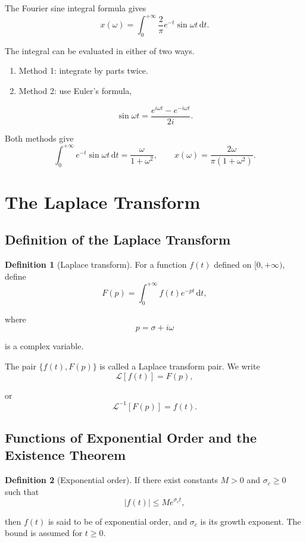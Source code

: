 \documentclass[11pt,a4paper]{article}
\theoremstyle{definition}
\newtheorem{definition}{Definition}
\theoremstyle{plain}
\begin{document}
The Fourier sine integral formula gives
\[
x(\omega)=\int_0^{+\infty}
\frac2\pi e^{-t}\sin\omega t\,\mathrm dt.
\]

The integral can be evaluated in either of two ways.

\begin{enumerate}
\item
  Method 1: integrate by parts twice.

\item
  Method 2: use Euler's formula,

\end{enumerate}
\[
\sin\omega t=\frac{e^{i\omega t}-e^{-i\omega t}}{2i}.
\]

Both methods give
\[
\int_0^{+\infty}e^{-t}\sin\omega t\,\mathrm dt
=\frac{\omega}{1+\omega^2},
\qquad
x(\omega)=\frac{2\omega}{\pi(1+\omega^2)}.
\]

\section{The Laplace Transform}

\subsection{Definition of the Laplace Transform}

\begin{definition}[Laplace transform]
For a function \(f(t)\) defined on \([0,+\infty)\), define
\[
F(p)=\int_0^{+\infty}f(t)e^{-pt}\,\mathrm dt,
\]

where
\[
p=\sigma+i\omega
\]

is a complex variable.

The pair \(\{f(t),F(p)\}\) is called a Laplace transform pair. We write
\[
\mathcal L[f(t)]=F(p),
\]

or
\[
\mathcal L^{-1}[F(p)]=f(t).
\]

\end{definition}

\subsection{Functions of Exponential Order and the Existence Theorem}

\begin{definition}[Exponential order]
If there exist constants \(M>0\) and \(\sigma_c\ge0\) such that
\[
|f(t)|\le Me^{\sigma_ct},
\]

then \(f(t)\) is said to be of exponential order, and \(\sigma_c\) is
its growth exponent. The bound is assumed for \(t\ge0\).
\end{definition}
\end{document}
